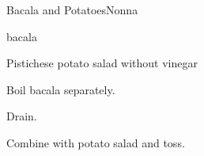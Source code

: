 \begin{recipe}{Bacala and Potatoes}{Nonna}{}

\begin{ingredients}
\item bacala
\item Pistichese potato salad without vinegar
\end{ingredients}

\begin{directions}
\item Boil bacala separately.
\item Drain.
\item Combine with potato salad and toss.
\end{directions}

\end{recipe}
